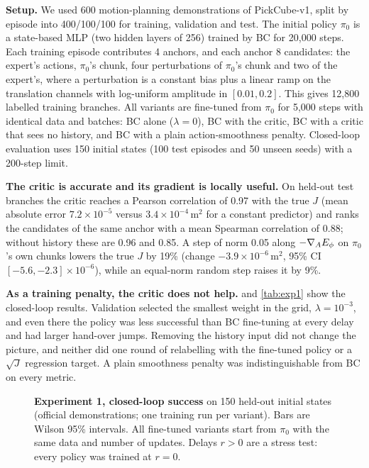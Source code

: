 \textbf{Setup.} We used 600 motion-planning demonstrations of PickCube-v1, split by episode into 400/100/100 for training, validation and test. The initial policy $\pi_0$ is a state-based MLP (two hidden layers of 256) trained by BC for 20{,}000 steps. Each training episode contributes 4 anchors, and each anchor 8 candidates: the expert's actions, $\pi_0$'s chunk, four perturbations of $\pi_0$'s chunk and two of the expert's, where a perturbation is a constant bias plus a linear ramp on the translation channels with log-uniform amplitude in $[0.01,0.2]$. This gives 12{,}800 labelled training branches. All variants are fine-tuned from $\pi_0$ for 5{,}000 steps with identical data and batches: BC alone ($\lambda=0$), BC with the critic, BC with a critic that sees no history, and BC with a plain action-smoothness penalty. Closed-loop evaluation uses 150 initial states (100 test episodes and 50 unseen seeds) with a 200-step limit.

\textbf{The critic is accurate and its gradient is locally useful.} On held-out test branches the critic reaches a Pearson correlation of 0.97 with the true $J$ (mean absolute error $7.2\times10^{-5}$ versus $3.4\times10^{-4}\,\mathrm{m}^2$ for a constant predictor) and ranks the candidates of the same anchor with a mean Spearman correlation of 0.88; without history these are 0.96 and 0.85. A step of norm 0.05 along $-\nabla_A E_\phi$ on $\pi_0$'s own chunks lowers the true $J$ by 19\% (change $-3.9\times10^{-6}\,\mathrm{m}^2$, 95\% CI $[-5.6,-2.3]\times10^{-6}$), while an equal-norm random step raises it by 9\%.

\textbf{As a training penalty, the critic does not help.}  and \cref{tab:exp1} show the closed-loop results. Validation selected the smallest weight in the grid, $\lambda=10^{-3}$, and even there the policy was less successful than BC fine-tuning at every delay and had larger hand-over jumps. Removing the history input did not change the picture, and neither did one round of relabelling with the fine-tuned policy or a $\sqrt{J}$ regression target. A plain smoothness penalty was indistinguishable from BC on every metric.

\begin{figure}[t]
  \centering
  \caption{\textbf{Experiment 1, closed-loop success} on 150 held-out initial states (official demonstrations; one training run per variant). Bars are Wilson 95\% intervals. All fine-tuned variants start from $\pi_0$ with the same data and number of updates. Delays $r>0$ are a stress test: every policy was trained at $r=0$.}
  \label{fig:exp1-success}
\end{figure}

